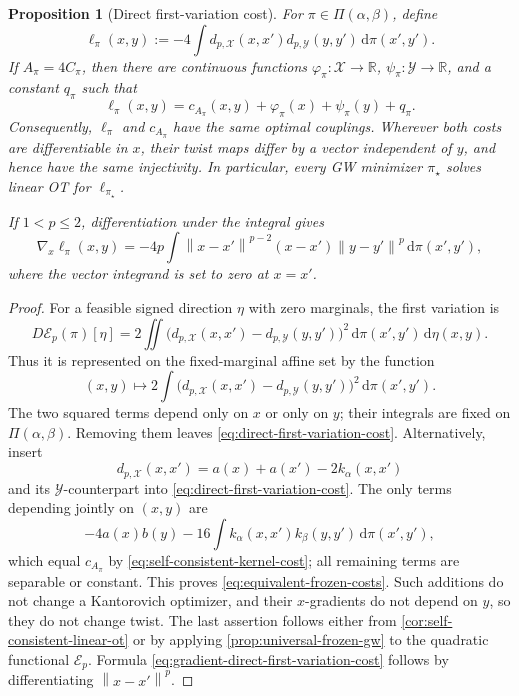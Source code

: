 \documentclass[11pt,a4paper]{article}
\newtheorem{proposition}[theorem]{Proposition}
\theoremstyle{definition}
\theoremstyle{remark}
\newcommand{\R}{\mathbb R}
\newcommand{\Ecal}{\mathcal E}
\newcommand{\Piopt}{\Pi}
\newcommand{\dd}{\,\mathrm d}
\newcommand{\norm}[1]{\left\lVert #1\right\rVert}
\begin{document}
\begin{proposition}[Direct first-variation cost]
\label{prop:direct-first-variation-cost}
For \(\pi\in\Piopt(\alpha,\beta)\), define
\begin{equation}
  \ell_\pi(x,y)
  :=-4\int
  d_{p,\mathcal X}(x,x')d_{p,\mathcal Y}(y,y')
  \dd\pi(x',y').
  \label{eq:direct-first-variation-cost}
\end{equation}
If \(A_\pi=4C_\pi\), then there are continuous functions
\(\varphi_\pi:\mathcal X\to\R\), \(\psi_\pi:\mathcal Y\to\R\), and a
constant \(q_\pi\) such that
\begin{equation}
  \ell_\pi(x,y)
  =c_{A_\pi}(x,y)+\varphi_\pi(x)+\psi_\pi(y)+q_\pi.
  \label{eq:equivalent-frozen-costs}
\end{equation}
Consequently, \(\ell_\pi\) and \(c_{A_\pi}\) have the same optimal
couplings.  Wherever both costs are differentiable in \(x\), their twist maps
differ by a vector independent of \(y\), and hence have the same injectivity.
In particular, every GW minimizer \(\pi_\star\) solves linear OT for
\(\ell_{\pi_\star}\).

If \(1<p\leq2\), differentiation under the integral gives
\begin{equation}
  \nabla_x\ell_\pi(x,y)
  =-4p\int
  \norm{x-x'}^{p-2}(x-x')\norm{y-y'}^p
  \dd\pi(x',y'),
  \label{eq:gradient-direct-first-variation-cost}
\end{equation}
where the vector integrand is set to zero at \(x=x'\).
\end{proposition}

\begin{proof}
For a feasible signed direction \(\eta\) with zero marginals, the first
variation is
\[
  D\Ecal_p(\pi)[\eta]
  =2\iint
  \bigl(d_{p,\mathcal X}(x,x')-d_{p,\mathcal Y}(y,y')\bigr)^2
  \dd\pi(x',y')\dd\eta(x,y).
\]
Thus it is represented on the fixed-marginal affine set by the function
\[
  (x,y)\longmapsto
  2\int
  \bigl(d_{p,\mathcal X}(x,x')-d_{p,\mathcal Y}(y,y')\bigr)^2
  \dd\pi(x',y').
\]
The two squared terms depend only on \(x\) or only on \(y\); their integrals
are fixed on \(\Piopt(\alpha,\beta)\).  Removing them leaves
\eqref{eq:direct-first-variation-cost}.  Alternatively, insert
\[
  d_{p,\mathcal X}(x,x')=a(x)+a(x')-2k_\alpha(x,x')
\]
and its \(\mathcal Y\)-counterpart into
\eqref{eq:direct-first-variation-cost}.  The only terms depending jointly on
\((x,y)\) are
\[
  -4a(x)b(y)
  -16\int k_\alpha(x,x')k_\beta(y,y')\dd\pi(x',y'),
\]
which equal \(c_{A_\pi}\) by
\eqref{eq:self-consistent-kernel-cost}; all remaining terms are separable or
constant.  This proves \eqref{eq:equivalent-frozen-costs}.  Such additions do
not change a Kantorovich optimizer, and their \(x\)-gradients do not depend on
\(y\), so they do not change twist.  The last assertion follows either from
\cref{cor:self-consistent-linear-ot} or by applying
\cref{prop:universal-frozen-gw} to the quadratic functional \(\Ecal_p\).
Formula
\eqref{eq:gradient-direct-first-variation-cost} follows by differentiating
\(\norm{x-x'}^p\).
\end{proof}
\end{document}
